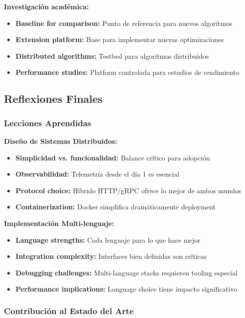 \textbf{Investigación académica:}
\begin{itemize}
    \item \textbf{Baseline for comparison:} Punto de referencia para nuevos algoritmos
    \item \textbf{Extension platform:} Base para implementar nuevas optimizaciones
    \item \textbf{Distributed algorithms:} Testbed para algoritmos distribuidos
    \item \textbf{Performance studies:} Platform controlada para estudios de rendimiento
\end{itemize}

\subsection{Reflexiones Finales}

\subsubsection{Lecciones Aprendidas}

\textbf{Diseño de Sistemas Distribuidos:}
\begin{itemize}
    \item \textbf{Simplicidad vs. funcionalidad:} Balance crítico para adopción
    \item \textbf{Observabilidad:} Telemetría desde el día 1 es esencial
    \item \textbf{Protocol choice:} Híbrido HTTP/gRPC ofrece lo mejor de ambos mundos
    \item \textbf{Containerization:} Docker simplifica dramáticamente deployment
\end{itemize}

\textbf{Implementación Multi-lenguaje:}
\begin{itemize}
    \item \textbf{Language strengths:} Cada lenguaje para lo que hace mejor
    \item \textbf{Integration complexity:} Interfaces bien definidas son críticas
    \item \textbf{Debugging challenges:} Multi-language stacks requieren tooling especial
    \item \textbf{Performance implications:} Language choice tiene impacto significativo
\end{itemize}

\subsubsection{Contribución al Estado del Arte}

